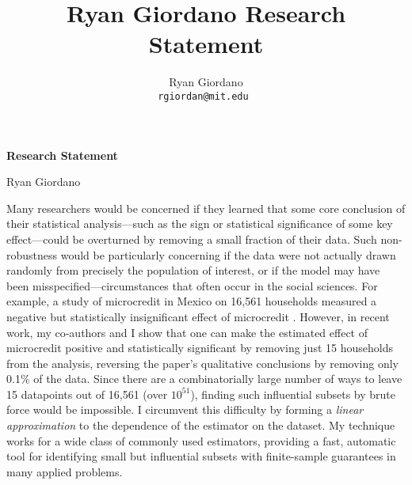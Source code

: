 
\usepackage{enumitem}

\usepackage{geometry}
\geometry{top=0.9in}
\geometry{left=1.0in}
\geometry{right=1.0in}

\title{Ryan Giordano Research Statement}

\author{
  Ryan Giordano \\ \texttt{rgiordan@mit.edu }
}



\begin{minipage}[t]{0.5\textwidth}
\hspace{-2em} %
{\bf \LARGE Research Statement}\\
\end{minipage}
\begin{minipage}[t]{0.5\textwidth}
        \hspace{8em} %
        {\LARGE Ryan Giordano}
\end{minipage}

Many researchers would be concerned if they learned that some core conclusion of
their statistical analysis---such as the sign or statistical significance of
some key effect---could be overturned by removing a small fraction of their
data. Such non-robustness would be particularly concerning if the data were not
actually drawn randomly from precisely the population of interest, or if the
model may have been misspecified---circumstances that often occur in the social
sciences. For example, a study of microcredit in Mexico on 16,561 households
measured a negative but statistically insignificant effect of microcredit
\citep{angelucci:2015:microcredit}.  However, in recent work, my co-authors and
I show that one can make the estimated effect of microcredit positive and
statistically significant by removing just 15 households from the analysis,
reversing the paper's qualitative conclusions by removing only 0.1\% of the
data.  Since there are a combinatorially large number of ways to leave 15
datapoints out of 16,561 (over $10^{51}$), finding such influential subsets by
brute force would be impossible.  I circumvent this difficulty by forming a
\emph{linear approximation} to the dependence of the estimator on the dataset.
My technique works for a wide class of commonly used estimators, providing a
fast, automatic tool for identifying small but influential subsets with
finite-sample guarantees in many applied problems.

